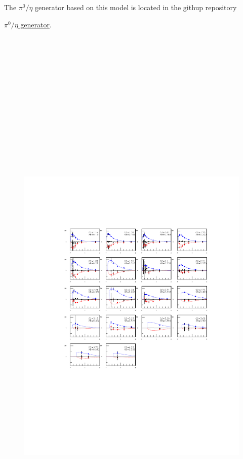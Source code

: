\documentclass[prc,floatfix,superscriptaddress]{revtex4}
\begin{document}
The $\pi^0/\eta$ generator based on this model is located in the githup repository

\href{https://github.com/drewkenjo/aao_norad}{$\pi^0/\eta$ generator}.





\begin{figure}[t!]
\vspace*{-10 mm}
\centerline{
\includegraphics[height=30cm]{../Test_plots/pi0_sf.pdf}
}
\end{figure}
\end{document}
